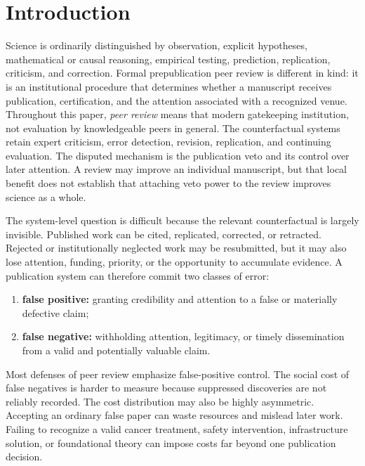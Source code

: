 \section{Introduction}

Science is ordinarily distinguished by observation, explicit hypotheses, mathematical or causal reasoning, empirical testing, prediction, replication, criticism, and correction. Formal prepublication peer review is different in kind: it is an institutional procedure that determines whether a manuscript receives publication, certification, and the attention associated with a recognized venue. Throughout this paper, \emph{peer review} means that modern gatekeeping institution, not evaluation by knowledgeable peers in general. The counterfactual systems retain expert criticism, error detection, revision, replication, and continuing evaluation. The disputed mechanism is the publication veto and its control over later attention. A review may improve an individual manuscript, but that local benefit does not establish that attaching veto power to the review improves science as a whole.

The system-level question is difficult because the relevant counterfactual is largely invisible. Published work can be cited, replicated, corrected, or retracted. Rejected or institutionally neglected work may be resubmitted, but it may also lose attention, funding, priority, or the opportunity to accumulate evidence. A publication system can therefore commit two classes of error:

\begin{enumerate}[label=(\roman*)]
    \item \textbf{false positive:} granting credibility and attention to a false or materially defective claim;
    \item \textbf{false negative:} withholding attention, legitimacy, or timely dissemination from a valid and potentially valuable claim.
\end{enumerate}

Most defenses of peer review emphasize false-positive control. The social cost of false negatives is harder to measure because suppressed discoveries are not reliably recorded. The cost distribution may also be highly asymmetric. Accepting an ordinary false paper can waste resources and mislead later work. Failing to recognize a valid cancer treatment, safety intervention, infrastructure solution, or foundational theory can impose costs far beyond one publication decision.

